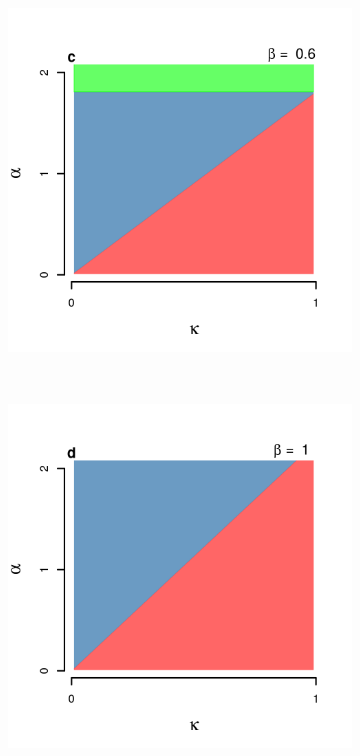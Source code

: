 \documentclass[9pt,twocolumn,twoside,lineno]{pnas-new}
\begin{document}
\begin{figure}[t!]
  \begin{subfigure}{0.5\textwidth}
   \centering
      \includegraphics[scale=0.4]{figure_2c.png}
  \end{subfigure}%
  ~%
  \begin{subfigure}{0.5\textwidth}
   \centering
      \includegraphics[scale=0.4]{figure_2d.png}
  \end{subfigure}%


\end{figure}
\end{document}
